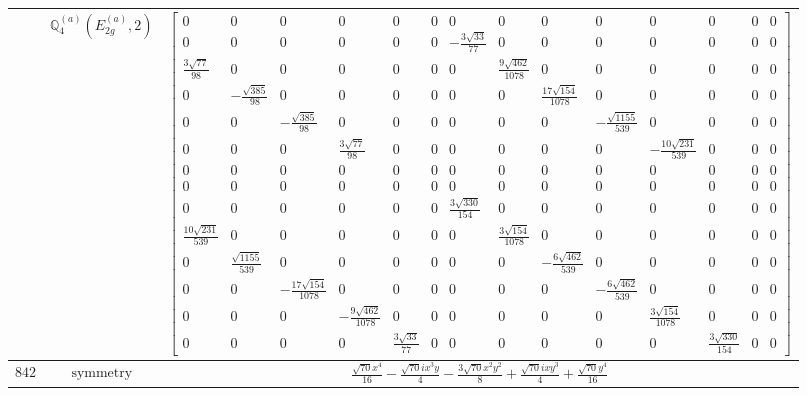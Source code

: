 \documentclass[fleqn,8pt,landscape]{jsarticle}
\begin{document}
\begin{longtable}{ccc}
$  $ & $ \mathbb{Q}_{4}^{(a)}(E_{2g}^{(a)},2) $ & $ \begin{bmatrix} 0 & 0 & 0 & 0 & 0 & 0 & 0 & 0 & 0 & 0 & 0 & 0 & 0 & 0 \\ 0 & 0 & 0 & 0 & 0 & 0 & - \frac{3 \sqrt{33}}{77} & 0 & 0 & 0 & 0 & 0 & 0 & 0 \\ \frac{3 \sqrt{77}}{98} & 0 & 0 & 0 & 0 & 0 & 0 & \frac{9 \sqrt{462}}{1078} & 0 & 0 & 0 & 0 & 0 & 0 \\ 0 & - \frac{\sqrt{385}}{98} & 0 & 0 & 0 & 0 & 0 & 0 & \frac{17 \sqrt{154}}{1078} & 0 & 0 & 0 & 0 & 0 \\ 0 & 0 & - \frac{\sqrt{385}}{98} & 0 & 0 & 0 & 0 & 0 & 0 & - \frac{\sqrt{1155}}{539} & 0 & 0 & 0 & 0 \\ 0 & 0 & 0 & \frac{3 \sqrt{77}}{98} & 0 & 0 & 0 & 0 & 0 & 0 & - \frac{10 \sqrt{231}}{539} & 0 & 0 & 0 \\ 0 & 0 & 0 & 0 & 0 & 0 & 0 & 0 & 0 & 0 & 0 & 0 & 0 & 0 \\ 0 & 0 & 0 & 0 & 0 & 0 & 0 & 0 & 0 & 0 & 0 & 0 & 0 & 0 \\ 0 & 0 & 0 & 0 & 0 & 0 & \frac{3 \sqrt{330}}{154} & 0 & 0 & 0 & 0 & 0 & 0 & 0 \\ \frac{10 \sqrt{231}}{539} & 0 & 0 & 0 & 0 & 0 & 0 & \frac{3 \sqrt{154}}{1078} & 0 & 0 & 0 & 0 & 0 & 0 \\ 0 & \frac{\sqrt{1155}}{539} & 0 & 0 & 0 & 0 & 0 & 0 & - \frac{6 \sqrt{462}}{539} & 0 & 0 & 0 & 0 & 0 \\ 0 & 0 & - \frac{17 \sqrt{154}}{1078} & 0 & 0 & 0 & 0 & 0 & 0 & - \frac{6 \sqrt{462}}{539} & 0 & 0 & 0 & 0 \\ 0 & 0 & 0 & - \frac{9 \sqrt{462}}{1078} & 0 & 0 & 0 & 0 & 0 & 0 & \frac{3 \sqrt{154}}{1078} & 0 & 0 & 0 \\ 0 & 0 & 0 & 0 & \frac{3 \sqrt{33}}{77} & 0 & 0 & 0 & 0 & 0 & 0 & \frac{3 \sqrt{330}}{154} & 0 & 0 \end{bmatrix} $ \\ \hline
$ 842 $ & $ \text{symmetry} $ & $ \frac{\sqrt{70} x^{4}}{16} - \frac{\sqrt{70} i x^{3} y}{4} - \frac{3 \sqrt{70} x^{2} y^{2}}{8} + \frac{\sqrt{70} i x y^{3}}{4} + \frac{\sqrt{70} y^{4}}{16} $ \\

\end{longtable}
\end{document}
